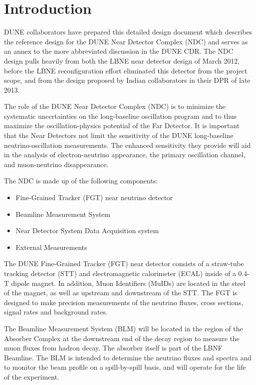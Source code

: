 \chapter{Introduction}  
\label{ch:nd-annex-intro}

DUNE collaborators have prepared this detailed design document which describes the reference design for 
the DUNE Near Detector Complex (NDC) and serves as an annex to the more abbreviated discussion in the DUNE 
CDR.  The NDC design pulls heavily from both the LBNE near detector design of March 2012, before the LBNE reconfiguration effort eliminated this detector from the project scope, and from the design proposed by Indian collaborators in their DPR of late 2013.

The role of the DUNE Near Detector Complex (NDC) is to 
minimize the systematic uncertainties on 
the long-baseline oscillation program and to thus maximize the 
oscillation-physics potential of the Far Detector. It is important that the
 Near Detectors not limit the sensitivity of the 
DUNE long-baseline neutrino-oscillation measurements. 
The enhanced sensitivity they provide will aid in the analysis of electron-neutrino 
appearance, the primary oscillation channel, and muon-neutrino disappearance. 

The NDC is made up of the following components:

\begin{itemize}
\item Fine-Grained Tracker (FGT) near neutrino detector
\item Beamline Measurement System
\item Near Detector System Data Acquisition system
\item External Measurements
\end{itemize}

The DUNE Fine-Grained Tracker (FGT) near detector consists of a straw-tube
tracking detector (STT) and electromagnetic calorimeter (ECAL) inside of a 0.4-T
dipole magnet. In addition, Muon Identifiers (MuIDs) are located in the
steel of the magnet, as well as upstream and downstream of the STT. The FGT
is designed to make precision measurements of the neutrino fluxes, 
cross sections, signal rates and background rates. 

The Beamline Measurement System (BLM) will be located in the region of the Absorber Complex at 
the downstream end of the decay region to measure the muon fluxes from hadron decay. The 
absorber itself is part of the LBNF Beamline. 
The BLM is intended to determine the neutrino fluxes and spectra
and to monitor the beam profile on a spill-by-spill basis, and will operate for the life of the
experiment. 

